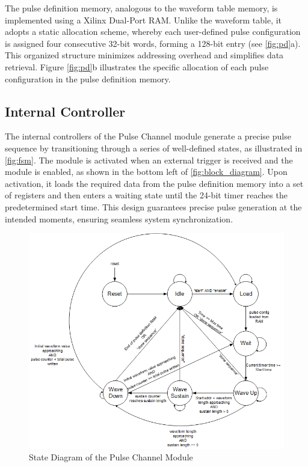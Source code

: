 The pulse definition memory, analogous to the waveform table memory, is implemented using a Xilinx Dual-Port RAM. Unlike the waveform table, it adopts a static allocation scheme, whereby each user-defined pulse configuration is assigned four consecutive 32-bit words, forming a 128-bit entry (see \autoref{fig:pd}a). This organized structure minimizes addressing overhead and simplifies data retrieval. Figure \autoref{fig:pd}b illustrates the specific allocation of each pulse configuration in the pulse definition memory.

\subsection{Internal Controller}
The internal controllers of the Pulse Channel module generate a precise pulse sequence by transitioning through a series of well-defined states, as illustrated in \autoref{fig:fsm}. The module is activated when an external trigger is received and the module is enabled, as shown in the bottom left of \autoref{fig:block_diagram}. Upon activation, it loads the required data from the pulse definition memory into a set of registers and then enters a waiting state until the 24-bit timer reaches the predetermined start time. This design guarantees precise pulse generation at the intended moments, ensuring seamless system synchronization.

\begin{figure}[htbp]
    \centering
    \includegraphics[width=1\linewidth]{figures/3.4.png}
    \caption{State Diagram of the Pulse Channel Module}
    \label{fig:fsm}
\end{figure}

